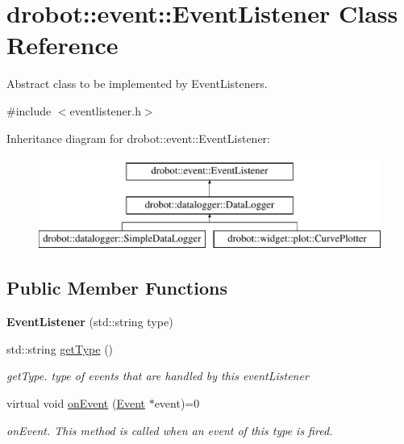 \hypertarget{classdrobot_1_1event_1_1EventListener}{\section{drobot\-:\-:event\-:\-:Event\-Listener Class Reference}
\label{classdrobot_1_1event_1_1EventListener}
}


Abstract class to be implemented by Event\-Listeners.  




{\ttfamily \#include $<$eventlistener.\-h$>$}

Inheritance diagram for drobot\-:\-:event\-:\-:Event\-Listener\-:\begin{figure}[H]
\begin{center}
\leavevmode
\includegraphics[height=3.000000cm]{classdrobot_1_1event_1_1EventListener}
\end{center}
\end{figure}
\subsection*{Public Member Functions}
\begin{DoxyCompactItemize}
\item 
\hypertarget{classdrobot_1_1event_1_1EventListener_ad9aa9dca8021eaa6d4499f8dca868305}{{\bfseries Event\-Listener} (std\-::string type)}\label{classdrobot_1_1event_1_1EventListener_ad9aa9dca8021eaa6d4499f8dca868305}

\item 
std\-::string \hyperlink{classdrobot_1_1event_1_1EventListener_af6f3b538bc3595de13959d9e35c0449e}{get\-Type} ()
\begin{DoxyCompactList}\small\item\em get\-Type. type of events that are handled by this event\-Listener \end{DoxyCompactList}\item 
virtual void \hyperlink{classdrobot_1_1event_1_1EventListener_ae5e30e4a518f6752a09f44f8dc6cdc51}{on\-Event} (\hyperlink{classdrobot_1_1event_1_1Event}{Event} $\ast$event)=0
\begin{DoxyCompactList}\small\item\em on\-Event. This method is called when an event of this type is fired. \end{DoxyCompactList}\end{DoxyCompactItemize}
